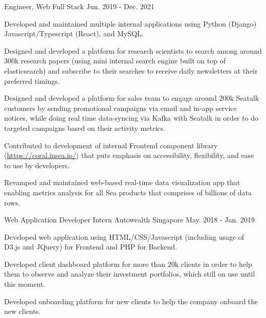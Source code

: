 \begin{cventries}
  \cventry
  {Engineer, Web Full Stack} %
  {} %
  {} %
  {Jun. 2019 - Dec. 2021} %
  {
    \begin{cvitems} %
      \item {Developed and maintained multiple internal applications using Python (Django) Javascript/Typescript (React), and MySQL.}
      \item {Designed and developed a platform for research scientists to search among around 300k research papers (using mini internal search engine built on top of elasticsearch) and subscribe to their searches to receive daily newsletters at their preferred timings.}
      \item {Designed and developed a platform for sales team to engage around 200k Seatalk customers by sending promotional campaigns via email and in-app service notices, while doing real time data-syncing via Kafka with Seatalk in order to do targeted campaigns based on their activity metrics.}
      \item {Contributed to development of internal Frontend component library (\url{https://coral.insea.io/}) that puts emphasis on accessibility, flexibility, and ease to use by developers.}
      \item {Revamped and maintained web-based real-time data visualization app that enabling metrics analysis for all Sea products that comprises of billions of data rows.}
    \end{cvitems}
  }

  \cventry
    {Web Application Developer Intern} %
    {Autowealth} %
    {Singapore} %
    {May. 2018 - Jan. 2019} %
    {
      \begin{cvitems} %
        \item {Developed web application using HTML/CSS/Javascript (including usage of D3.js and JQuery) for Frontend and PHP for Backend.}
        \item {Developed client dashboard platform for more than 20k clients in order to help them to observe and analyze their investment portfolios, which still on use until this moment.}
        \item {Developed onboarding platform for new clients to help the company onboard the new clients.}
      \end{cvitems}
    }

\end{cventries}
